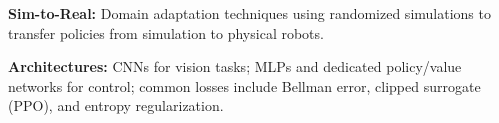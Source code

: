\documentclass{article}
\begin{document}
\textbf{Sim-to-Real:} Domain adaptation techniques using randomized simulations to transfer policies from simulation to physical robots.

\textbf{Architectures:} CNNs for vision tasks; MLPs and dedicated policy/value networks for control; common losses include Bellman error, clipped surrogate (PPO), and entropy regularization.

\end{document}
